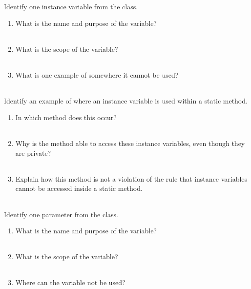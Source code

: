 \Q Identify one instance variable from the  class.
\begin{enumerate}
\item What is the name and purpose of the variable?
\\  \\[-2em]

\item What is the scope of the variable?
\\  \\[-2em]

\item What is one example of somewhere it cannot be used?
\\  \\[-2em]
\end{enumerate}


\Q Identify an example of where an instance variable is used within a static method.
\begin{enumerate}
\item In which method does this occur?
\\  \\[-2em]

\item Why is the method able to access these instance variables, even though they are private?
\\  \\[-2em]

\item Explain how this method is not a violation of the rule that instance variables cannot be accessed inside a static method.
\\  \\[-2em]
\end{enumerate}


\Q Identify one parameter from the  class.
\begin{enumerate}
\item What is the name and purpose of the variable?
\\  \\[-2em]

\item What is the scope of the variable?
\\  \\[-2em]

\item Where can the variable not be used?
\\  \\[-2em]
\end{enumerate}


